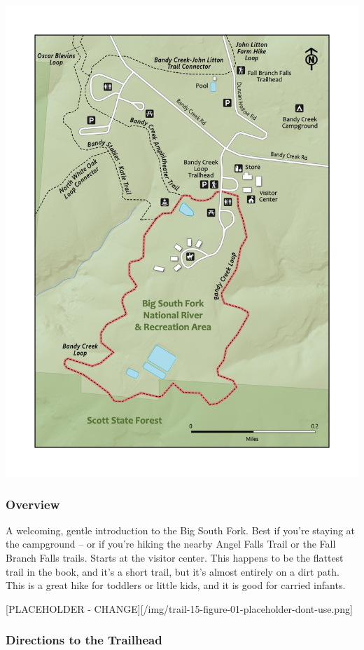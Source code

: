 \documentclass[
  letterpaper,
  DIV=11,
  numbers=noendperiod]{scrartcl}
\begin{document}
\includegraphics{maps/trail-15-map.jpeg}

\hypertarget{overview-14}{%
\subsubsection{Overview}\label{overview-14}}

A welcoming, gentle introduction to the Big South Fork. Best if you're
staying at the campground -- or if you're hiking the nearby Angel Falls
Trail or the Fall Branch Falls trails. Starts at the visitor center.
This happens to be the flattest trail in the book, and it's a short
trail, but it's almost entirely on a dirt path. This is a great hike for
toddlers or little kids, and it is good for carried infants.

{[}PLACEHOLDER -
CHANGE{]}{[}/img/trail-15-figure-01-placeholder-dont-use.png{]}

\hypertarget{directions-to-the-trailhead-14}{%
\subsubsection{Directions to the
Trailhead}\label{directions-to-the-trailhead-14}}
\end{document}
